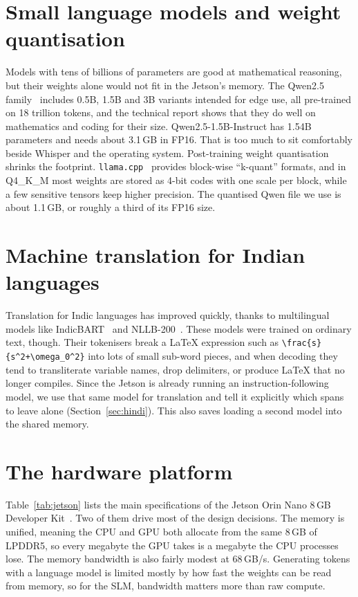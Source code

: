 \documentclass[11pt,a4paper,oneside]{report}
\theoremstyle{definition}
\begin{document}
\section{Small language models and weight quantisation}
Models with tens of billions of parameters are good at mathematical reasoning, but their weights alone would not fit in the Jetson's memory. The Qwen2.5 family~\cite{qwen2025report} includes 0.5B, 1.5B and 3B variants intended for edge use, all pre-trained on 18 trillion tokens, and the technical report shows that they do well on mathematics and coding for their size. Qwen2.5-1.5B-Instruct has 1.54B parameters and needs about 3.1\,GB in FP16. That is too much to sit comfortably beside Whisper and the operating system. Post-training weight quantisation~\cite{dettmers2022llmint8} shrinks the footprint. \texttt{llama.cpp}~\cite{llamacpp} provides block-wise ``k-quant'' formats, and in Q4\_K\_M most weights are stored as 4-bit codes with one scale per block, while a few sensitive tensors keep higher precision. The quantised Qwen file we use is about 1.1\,GB, or roughly a third of its FP16 size.

\section{Machine translation for Indian languages}
Translation for Indic languages has improved quickly, thanks to multilingual models like IndicBART~\cite{dabre2022indicbart} and NLLB-200~\cite{nllb2022}. These models were trained on ordinary text, though. Their tokenisers break a LaTeX expression such as \verb|\frac{s}{s^2+\omega_0^2}| into lots of small sub-word pieces, and when decoding they tend to transliterate variable names, drop delimiters, or produce LaTeX that no longer compiles. Since the Jetson is already running an instruction-following model, we use that same model for translation and tell it explicitly which spans to leave alone (Section~\ref{sec:hindi}). This also saves loading a second model into the shared memory.

\section{The hardware platform}
Table~\ref{tab:jetson} lists the main specifications of the Jetson Orin Nano 8\,GB Developer Kit~\cite{nvidia2023orinnano}. Two of them drive most of the design decisions. The memory is unified, meaning the CPU and GPU both allocate from the same 8\,GB of LPDDR5, so every megabyte the GPU takes is a megabyte the CPU processes lose. The memory bandwidth is also fairly modest at 68\,GB/s. Generating tokens with a language model is limited mostly by how fast the weights can be read from memory, so for the SLM, bandwidth matters more than raw compute.
\end{document}
